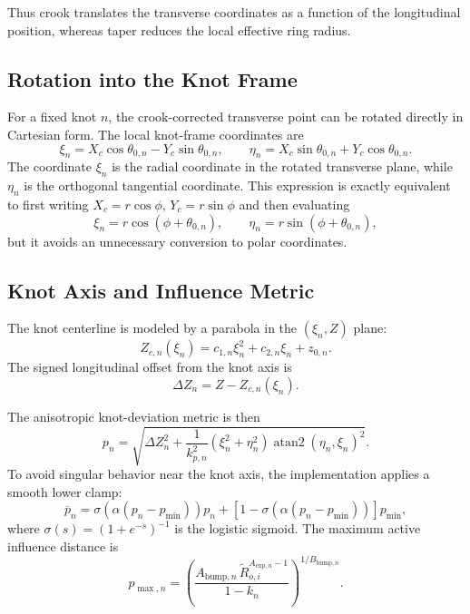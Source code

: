 \documentclass[11pt]{article}
\begin{document}
Thus crook translates the transverse coordinates as a function of the longitudinal position, whereas taper
reduces the local effective ring radius.

\subsection{Rotation into the Knot Frame}

For a fixed knot $n$, the crook-corrected transverse point can be rotated directly in Cartesian form. The local
knot-frame coordinates are
\begin{equation}
\xi_n = X_c \cos\theta_{0,n} - Y_c \sin\theta_{0,n},
\qquad
\eta_n = X_c \sin\theta_{0,n} + Y_c \cos\theta_{0,n}.
\end{equation}
The coordinate $\xi_n$ is the radial coordinate in the rotated transverse plane, while $\eta_n$ is the
orthogonal tangential coordinate. This expression is exactly equivalent to first writing
$X_c=r\cos\phi$, $Y_c=r\sin\phi$ and then evaluating
\[
\xi_n = r\cos(\phi+\theta_{0,n}), \qquad
\eta_n = r\sin(\phi+\theta_{0,n}),
\]
but it avoids an unnecessary conversion to polar coordinates.

\subsection{Knot Axis and Influence Metric}

The knot centerline is modeled by a parabola in the $(\xi_n,Z)$ plane:
\begin{equation}
Z_{c,n}(\xi_n) = c_{1,n}\xi_n^2 + c_{2,n}\xi_n + z_{0,n}.
\end{equation}
The signed longitudinal offset from the knot axis is
\begin{equation}
\Delta Z_n = Z - Z_{c,n}(\xi_n).
\end{equation}

The anisotropic knot-deviation metric is then
\begin{equation}
p_n
=
\sqrt{
\Delta Z_n^2
+
\frac{1}{k_{p,n}^2}
\left(\xi_n^2 + \eta_n^2\right)
\operatorname{atan2}(\eta_n,\xi_n)^2
}.
\end{equation}
To avoid singular behavior near the knot axis, the implementation applies a smooth lower clamp:
\begin{equation}
\overline{p}_n
=
\sigma\!\left(\alpha (p_n - p_{\min})\right)p_n
+
\left[1 - \sigma\!\left(\alpha (p_n - p_{\min})\right)\right]p_{\min},
\end{equation}
where $\sigma(s) = (1 + e^{-s})^{-1}$ is the logistic sigmoid. The maximum active influence distance is
\begin{equation}
p_{\max,n}
=
\left(
\frac{
A_{\mathrm{bump},n}\,\widetilde{R}_{o,i}^{A_{\mathrm{exp},n}-1}
}{
1-k_n
}
\right)^{1/B_{\mathrm{bump},n}}.
\end{equation}
\end{document}

